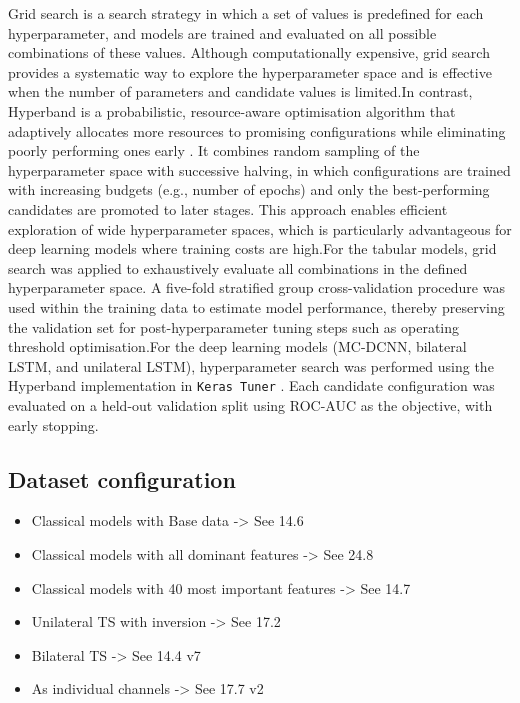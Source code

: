 Grid search is a search strategy in which a set of values is predefined for each hyperparameter, and models are trained and evaluated on all possible combinations of these values. Although computationally expensive, grid search provides a systematic way to explore the hyperparameter space and is effective when the number of parameters and candidate values is limited.In contrast, Hyperband is a probabilistic, resource-aware optimisation algorithm that adaptively allocates more resources to promising configurations while eliminating poorly performing ones early \citep{Li2017}. It combines random sampling of the hyperparameter space with successive halving, in which configurations are trained with increasing budgets (e.g., number of epochs) and only the best-performing candidates are promoted to later stages. This approach enables efficient exploration of wide hyperparameter spaces, which is particularly advantageous for deep learning models where training costs are high.For the tabular models, grid search was applied to exhaustively evaluate all combinations in the defined hyperparameter space. A five-fold stratified group cross-validation procedure was used within the training data to estimate model performance, thereby preserving the validation set for post-hyperparameter tuning steps such as operating threshold optimisation.For the deep learning models (MC-DCNN, bilateral LSTM, and unilateral LSTM), hyperparameter search was performed using the Hyperband implementation in \texttt{Keras Tuner} \citep{Li2017}. Each candidate configuration was evaluated on a held-out validation split using ROC-AUC as the objective, with early stopping.


\subsection{Dataset configuration}\label{subsec:method-data-config}
\begin{itemize}
    \item Classical models with Base data -> See 14.6
    \item Classical models with all dominant features ->  See 24.8
    \item Classical models with 40 most important features -> See 14.7
    \item Unilateral TS with inversion -> See 17.2
    \item Bilateral TS -> See 14.4 v7
    \item As individual channels -> See 17.7 v2
\end{itemize}


